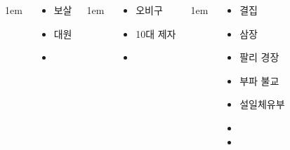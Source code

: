 \documentclass[20pt, a0paper, landscape]{tikzposter}
\begin{document}
\begin{columns}
			{
					\setlength{\leftmargini}{4em}
					\setlength{\labelsep} {1em}
				\begin{LARGE}
					\begin{itemize}
					\item 보살
					\item 대원
					\item 
					\end{itemize}
				\end{LARGE}
			} %



			{
					\setlength{\leftmargini}{4em}
					\setlength{\labelsep} {1em}
				\begin{LARGE}
					\begin{itemize}
					\item 오비구 
					\item 10대 제자 
					\item 
					\end{itemize}
				\end{LARGE}
			} %


			{
					\setlength{\leftmargini}{4em}
					\setlength{\labelsep} {1em}
				\begin{LARGE}
					\begin{itemize}
					\item 결집
					\item 삼장
					\item 팔리 경장
					\item 부파 불교
					\item 설일체유부
					\item 
					\item 
					\end{itemize}
				\end{LARGE}
			} %




\end{columns}
\end{document}
